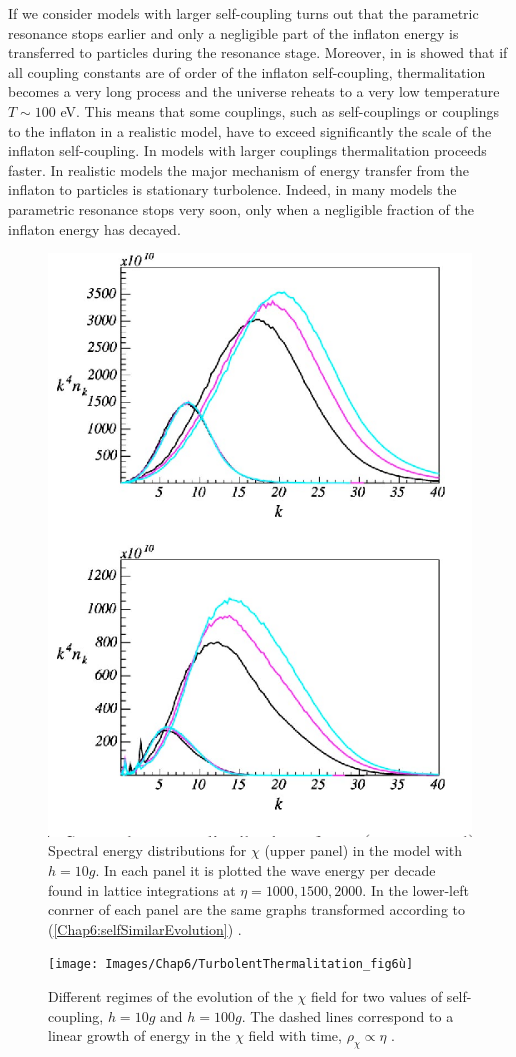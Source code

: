 \documentclass[11pt,a4paper,twoside]{book}
\begin{document}
If we consider models with larger self-coupling turns out that the parametric resonance stops earlier and only a negligible part of the inflaton energy is transferred to particles during the resonance stage. Moreover, in \cite{Chap6:TurbolentThermalitation} is showed that if all coupling constants are of order of the inflaton self-coupling, thermalitation becomes a very long process and the universe reheats to a very low temperature $ T \sim 100  $ eV. This means that some couplings, such as self-couplings or couplings to the inflaton in a realistic model, have to exceed significantly the scale of the inflaton self-coupling. In models with larger couplings thermalitation proceeds faster. In realistic models the major mechanism of energy transfer from the inflaton to particles is stationary turbolence. Indeed, in many models the parametric resonance stops very soon, only when a negligible fraction of the inflaton energy has decayed.
\begin{figure}
	\centering
	\includegraphics[width=0.6\linewidth, height=0.35\textheight]{Images/Chap6/TurbolentThermalitation_fig5}
	\caption{Spectral energy distributions for $\chi$ (upper panel) in the model with $ h=10g $. In each panel it is plotted the wave energy per decade found in lattice integrations at $\eta = 1000, 1500, 2000$. In the lower-left conrner of each panel are the same graphs transformed according to (\ref{Chap6:selfSimilarEvolution}) \cite{Chap6:TurbolentThermalitation}.}
	\label{fig:turbolentthermalitationfig5}
\end{figure}
\begin{figure}
	\centering
	\texttt{[image: Images/Chap6/TurbolentThermalitation\_fig6ù]}
	\caption{Different regimes of the evolution of the $\chi$ field for two values of self-coupling, $ h=10g $ and $ h=100g $. The dashed lines correspond to a linear growth of energy in the $\chi$ field with time, $\rho_{\chi} \propto \eta$ \cite{Chap6:TurbolentThermalitation}.}
	\label{fig:turbolentthermalitationfig6u}
\end{figure}
\end{document}
